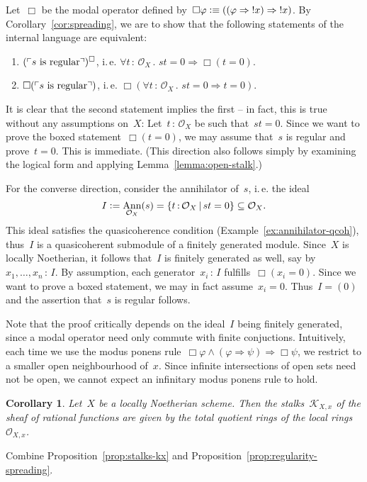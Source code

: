 \documentclass[10pt,reqno,a4paper]{amsbook}
\makeatletter
\theoremstyle{definition}
\theoremstyle{plain}
\newtheorem{cor}[defn]{Corollary}
\theoremstyle{remark}
\renewcommand{\O}{\mathcal{O}}
\newcommand{\K}{\mathcal{K}}
\DeclareMathOperator{\Ann}{Ann}
\newcommand{\?}{\,{:}\,}
\renewcommand{\_}{\mathpunct{.}\,}
\newcommand{\speak}[1]{\ulcorner\text{\textnormal{#1}}\urcorner}
\newcommand{\ie}{i.\,e.\@\xspace}
\newcommand{\defeq}{\vcentcolon=}
\newcommand{\defequiv}{\vcentcolon\equiv}
\renewenvironment{proof}[1][\proofname]{\par
  \pushQED{\qed}%
  \normalfont \topsep6\p@\@plus6\p@\relax
  \trivlist
  \item[\hskip\labelsep
        \itshape
    #1\@addpunct{.}]\ignorespaces
}{%
  \popQED\endtrivlist\@endpefalse
}
\makeatother
\begin{document}
\begin{proof}
Let~$\Box$ be the modal operator defined by~$\Box\varphi \defequiv ((\varphi
\Rightarrow {!x}) \Rightarrow {!x})$. By Corollary~\ref{cor:spreading}, we are
to show that the following statements of the internal language are equivalent:
\begin{enumerate}
\item $(\speak{$s$ is regular})^\Box$, \ie
$\forall t\?\O_X\_ st = 0 \Rightarrow \Box(t = 0)$.
\item $\Box(\speak{$s$ is regular})$, \ie
$\Box(\forall t\?\O_X\_ st = 0 \Rightarrow t = 0)$.
\end{enumerate}
It is clear that the second statement implies the first -- in fact, this is true
without any assumptions on~$X$: Let~$t\?\O_X$ be such that~$st = 0$. Since we want to
prove the boxed statement~$\Box(t=0)$, we may assume that~$s$ is regular and
prove~$t = 0$. This is immediate. (This direction also follows simply by
examining the logical form and applying Lemma~\ref{lemma:open-stalk}.)

For the converse direction, consider the annihilator of~$s$, \ie the ideal
\[ I \defeq \Ann_{\O_X}(s) = \{ t\?\O_X \,|\, st = 0 \} \subseteq \O_X. \]
This ideal satisfies the quasicoherence condition (Example~\ref{ex:annihilator-qcoh}),
thus~$I$ is a quasicoherent submodule of a finitely generated module. Since~$X$ is
locally Noetherian, it follows that~$I$ is finitely generated as well, say by~$x_1,\ldots,x_n \? I$. By
assumption, each generator~$x_i \? I$ fulfills~$\Box(x_i = 0)$. Since we want
to prove a boxed statement, we may in fact assume~$x_i = 0$. Thus~$I = (0)$ and
the assertion that~$s$ is regular follows.
\end{proof}

Note that the proof critically depends on the ideal~$I$ being finitely
generated, since a modal operator need only commute with finite
conjuctions. Intuitively, each time we use the modus ponens rule~$\Box\varphi \wedge
(\varphi \Rightarrow \psi) \Rightarrow \Box\psi$, we restrict to a smaller open
neighbourhood of~$x$. Since infinite intersections of open sets need not be
open, we cannot expect an infinitary modus ponens rule to hold.

\begin{cor}Let~$X$ be a locally Noetherian scheme. Then the stalks~$\K_{X,x}$
of the sheaf of rational functions are given by the total quotient rings of the
local rings~$\O_{X,x}$.\end{cor}
\begin{proof}Combine Proposition~\ref{prop:stalks-kx} and
Proposition~\ref{prop:regularity-spreading}.\end{proof}
\end{document}
